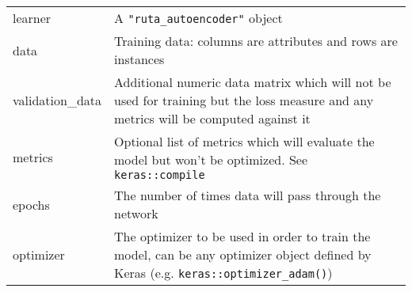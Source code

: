 \begin{longtable}[c]{@{}ll@{}}
\toprule
\begin{minipage}[t]{0.09\columnwidth}\raggedright\strut
learner
\strut\end{minipage} &
\begin{minipage}[t]{0.84\columnwidth}\raggedright\strut
A \texttt{"ruta\_autoencoder"} object
\strut\end{minipage}\tabularnewline
\begin{minipage}[t]{0.09\columnwidth}\raggedright\strut
data
\strut\end{minipage} &
\begin{minipage}[t]{0.84\columnwidth}\raggedright\strut
Training data: columns are attributes and rows are instances
\strut\end{minipage}\tabularnewline
\begin{minipage}[t]{0.09\columnwidth}\raggedright\strut
validation\_data
\strut\end{minipage} &
\begin{minipage}[t]{0.84\columnwidth}\raggedright\strut
Additional numeric data matrix which will not be used for training but
the loss measure and any metrics will be computed against it
\strut\end{minipage}\tabularnewline
\begin{minipage}[t]{0.09\columnwidth}\raggedright\strut
metrics
\strut\end{minipage} &
\begin{minipage}[t]{0.84\columnwidth}\raggedright\strut
Optional list of metrics which will evaluate the model but won't be
optimized. See \texttt{keras::compile}
\strut\end{minipage}\tabularnewline
\begin{minipage}[t]{0.09\columnwidth}\raggedright\strut
epochs
\strut\end{minipage} &
\begin{minipage}[t]{0.84\columnwidth}\raggedright\strut
The number of times data will pass through the network
\strut\end{minipage}\tabularnewline
\begin{minipage}[t]{0.09\columnwidth}\raggedright\strut
optimizer
\strut\end{minipage} &
\begin{minipage}[t]{0.84\columnwidth}\raggedright\strut
The optimizer to be used in order to train the model, can be any
optimizer object defined by Keras (e.g.
\texttt{keras::optimizer\_adam()})
\strut\end{minipage}\tabularnewline

\end{longtable}
